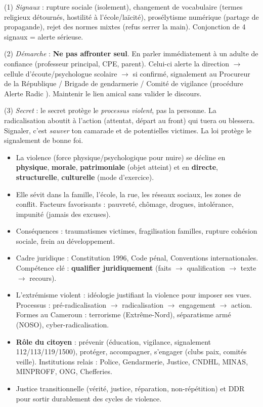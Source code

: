 \documentclass[11pt]{article}
\newcommand{\cle}[1]{{\popxbold\color{popdark}#1}}
\begin{document}
\begin{corrige}
(1) \emph{Signaux} : rupture sociale (isolement), changement de vocabulaire (termes religieux détournés, hostilité à l'école/laïcité), prosélytisme numérique (partage de propagande), rejet des normes mixtes (refus serrer la main). Conjonction de 4 signaux = alerte sérieuse.\par
(2) \emph{Démarche} : \textbf{Ne pas affronter seul}. En parler immédiatement à un adulte de confiance (professeur principal, CPE, parent). Celui-ci alerte la direction $\rightarrow$ cellule d'écoute/psychologue scolaire $\rightarrow$ si confirmé, signalement au Procureur de la République / Brigade de gendarmerie / Comité de vigilance (procédure \og Alerte Radic \fg{}). Maintenir le lien amical sans valider le discours.\par
(3) \emph{Secret} : le secret protège le \emph{processus violent}, pas la personne. La radicalisation aboutit à l'action (attentat, départ au front) qui tuera ou blessera. Signaler, c'est \emph{sauver} ton camarade et de potentielles victimes. La loi protège le signalement de bonne foi.
\end{corrige}

\begin{aretenir}
\begin{itemize}
\item La \cle{violence} (force physique/psychologique pour nuire) se décline en \textbf{physique}, \textbf{morale}, \textbf{patrimoniale} (objet atteint) et en \textbf{directe}, \textbf{structurelle}, \textbf{culturelle} (mode d'exercice).
\item Elle sévit dans la famille, l'école, la rue, les réseaux sociaux, les zones de conflit. Facteurs favorisants : pauvreté, chômage, drogues, intolérance, impunité (jamais des excuses).
\item Conséquences : traumatismes victimes, fragilisation familles, rupture cohésion sociale, frein au développement.
\item Cadre juridique : Constitution 1996, Code pénal, Conventions internationales. Compétence clé : \textbf{qualifier juridiquement} (faits $\rightarrow$ qualification $\rightarrow$ texte $\rightarrow$ recours).
\item L'\cle{extrémisme violent} : idéologie justifiant la violence pour imposer ses vues. Processus : pré-radicalisation $\rightarrow$ radicalisation $\rightarrow$ engagement $\rightarrow$ action. Formes au Cameroun : terrorisme (Extrême-Nord), séparatisme armé (NOSO), cyber-radicalisation.
\item \textbf{Rôle du citoyen} : prévenir (éducation, vigilance, signalement 112/113/119/1500), protéger, accompagner, s'engager (clubs paix, comités veille). Institutions relais : Police, Gendarmerie, Justice, CNDHL, MINAS, MINPROFF, ONG, Chefferies.
\item Justice transitionnelle (vérité, justice, réparation, non-répétition) et DDR pour sortir durablement des cycles de violence.
\end{itemize}
\end{aretenir}
\end{document}
